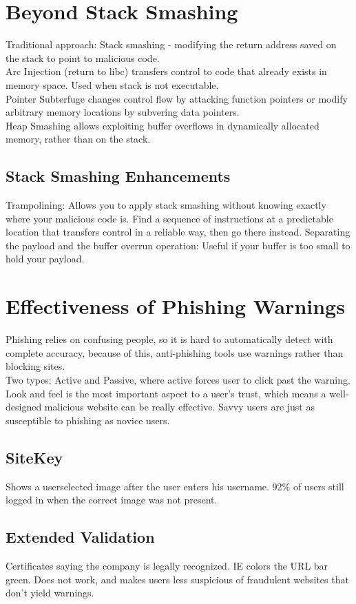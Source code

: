 \section{Beyond Stack Smashing}
Traditional approach: Stack smashing - modifying the return address saved on the stack to point to malicious code. \\
Arc Injection (return to libc) transfers control to code that already exists in memory space. Used when stack is not executable.\\
Pointer Subterfuge changes control flow by attacking function pointers or modify arbitrary memory locations by subvering data pointers. \\
Heap Smashing allows exploiting buffer overflows in dynamically allocated memory, rather than on the stack.
\subsection{Stack Smashing Enhancements}
Trampolining: Allows you to apply stack smashing without knowing exactly where your malicious code is. Find a sequence of instructions at a predictable location that transfers control in a reliable way, then go there instead.
Separating the payload and the buffer overrun operation: Useful if your buffer is too small to hold your payload.
\section{Effectiveness of Phishing Warnings}
Phishing relies on confusing people, so it is hard to automatically detect with complete accuracy, because of this, anti-phishing tools use warnings rather than blocking sites.\\
Two types: Active and Passive, where active forces user to click past the warning.\\
Look and feel is the most important aspect to a user's trust, which means a well-designed malicious website can be really effective. Savvy users are just as susceptible to phishing as novice users.
\subsection{SiteKey}
Shows a userselected image after the user enters his username. 92\% of users still logged in when the correct image was not present.
\subsection{Extended Validation}
Certificates saying the company is legally recognized. IE colors the URL bar green. Does not work, and makes users less suspicious of fraudulent websites that don't yield warnings.
